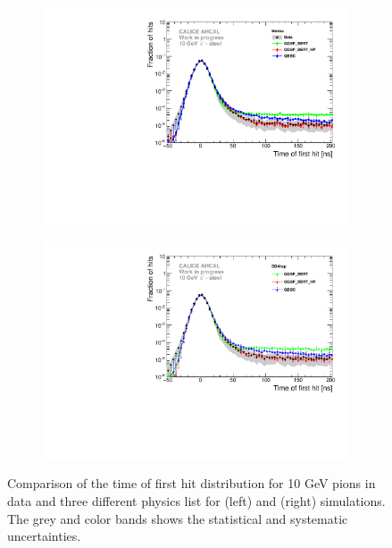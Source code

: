 \begin{figure}[htbp!]
	\begin{subfigure}[t]{0.5\textwidth}
		\centering
		\includegraphics[width=1\textwidth]{../Thesis_Plots/Timing/Pions/Plots/Comparison_SimData_Pion10GeV_LateClusters.pdf}
		\caption{}
	\end{subfigure}
	\hfill
	\begin{subfigure}[t]{0.5\textwidth}
		\centering
		\includegraphics[width=1\textwidth]{../Thesis_Plots/Timing/Pions/Plots/Comparison_SimData_Pion10GeV_LateClusters_DD4hep.pdf}
		\caption{}
	\end{subfigure}
	\caption{Comparison of the time of first hit distribution for 10 GeV pions in data and three different physics list for \mokka (left) and \ddhep (right) simulations. The grey and color bands shows the statistical and systematic uncertainties.} 	\label{fig:dNdt_SimData_10GeV}
\end{figure}

